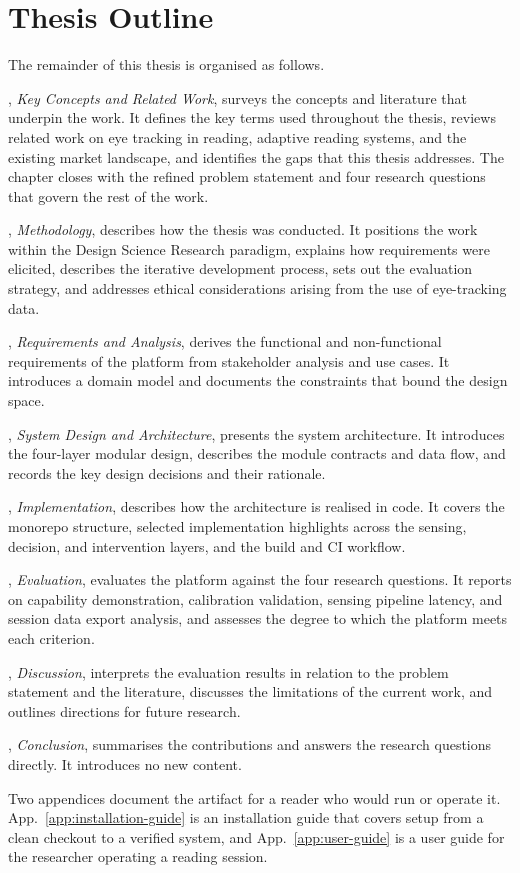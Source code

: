 \section{Thesis Outline}
\label{sec:thesis-outline}

The remainder of this thesis is organised as follows.

\textbf{}, \emph{Key Concepts and Related Work}, surveys the concepts and literature that underpin the work.
It defines the key terms used throughout the thesis, reviews related work on eye tracking in reading, adaptive reading systems, and the existing market landscape, and identifies the gaps that this thesis addresses.
The chapter closes with the refined problem statement and four research questions that govern the rest of the work.

\textbf{}, \emph{Methodology}, describes how the thesis was conducted.
It positions the work within the Design Science Research paradigm, explains how requirements were elicited, describes the iterative development process, sets out the evaluation strategy, and addresses ethical considerations arising from the use of eye-tracking data.

\textbf{}, \emph{Requirements and Analysis}, derives the functional and non-functional requirements of the platform from stakeholder analysis and use cases.
It introduces a domain model and documents the constraints that bound the design space.

\textbf{}, \emph{System Design and Architecture}, presents the system architecture.
It introduces the four-layer modular design, describes the module contracts and data flow, and records the key design decisions and their rationale.

\textbf{}, \emph{Implementation}, describes how the architecture is realised in code.
It covers the monorepo structure, selected implementation highlights across the sensing, decision, and intervention layers, and the build and CI workflow.

\textbf{}, \emph{Evaluation}, evaluates the platform against the four research questions.
It reports on capability demonstration, calibration validation, sensing pipeline latency, and session data export analysis, and assesses the degree to which the platform meets each criterion.

\textbf{}, \emph{Discussion}, interprets the evaluation results in relation to the problem statement and the literature, discusses the limitations of the current work, and outlines directions for future research.

\textbf{}, \emph{Conclusion}, summarises the contributions and answers the research questions directly.
It introduces no new content.

Two appendices document the artifact for a reader who would run or operate it.
App.~\ref{app:installation-guide} is an installation guide that covers setup from a clean checkout to a verified system, and App.~\ref{app:user-guide} is a user guide for the researcher operating a reading session.
